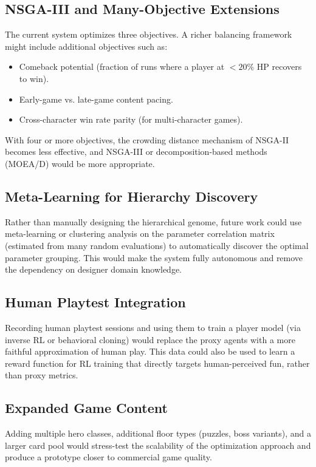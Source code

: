 \subsection{NSGA-III and Many-Objective Extensions}

The current system optimizes three objectives. A richer balancing framework might include additional objectives such as:
\begin{itemize}
    \item Comeback potential (fraction of runs where a player at $<20\%$ HP recovers to win).
    \item Early-game vs. late-game content pacing.
    \item Cross-character win rate parity (for multi-character games).
\end{itemize}
With four or more objectives, the crowding distance mechanism of NSGA-II becomes less effective, and NSGA-III \cite{deb2014evolutionary} or decomposition-based methods (MOEA/D) would be more appropriate.

\subsection{Meta-Learning for Hierarchy Discovery}

Rather than manually designing the hierarchical genome, future work could use meta-learning or clustering analysis on the parameter correlation matrix (estimated from many random evaluations) to automatically discover the optimal parameter grouping. This would make the system fully autonomous and remove the dependency on designer domain knowledge.

\subsection{Human Playtest Integration}

Recording human playtest sessions and using them to train a player model (via inverse RL or behavioral cloning) would replace the proxy agents with a more faithful approximation of human play. This data could also be used to learn a reward function for RL training that directly targets human-perceived fun, rather than proxy metrics.

\subsection{Expanded Game Content}

Adding multiple hero classes, additional floor types (puzzles, boss variants), and a larger card pool would stress-test the scalability of the optimization approach and produce a prototype closer to commercial game quality.

